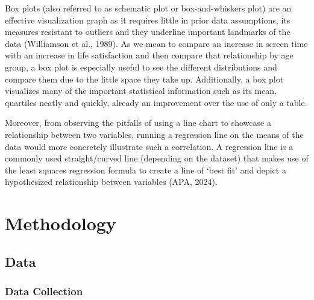 \documentclass[12pt, a4paper]{article}
\begin{document}
\newpage
\par Box plots (also referred to as schematic plot or box-and-whiskers plot) are an effective visualization graph as it requires little in prior data assumptions, its measures resistant to outliers and they underline important landmarks of the data (Williamson et al., 1989). As we mean to compare an increase in screen time with an increase in life satisfaction and then compare that relationship by age group, a box plot is especially useful to see the different distributions and compare them due to the little space they take up. Additionally, a box plot visualizes many of the important statistical information such as its mean, quartiles neatly and quickly, already an improvement over the use of only a table.
\par Moreover, from observing the pitfalls of using a line chart to showcase a relationship between two variables, running a regression line on the means of the data would more concretely illustrate such a correlation. A regression line is a commonly used straight/curved line (depending on the dataset) that makes use of the least squares regression formula to create a line of ‘best fit’ and depict a hypothesized relationship between variables (APA, 2024).

\section{Methodology}

\subsection{Data}
\subsubsection{Data Collection}
\end{document}

